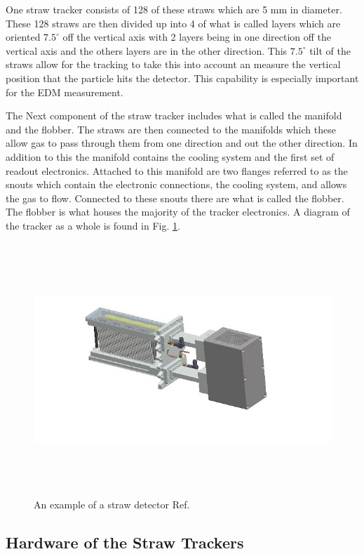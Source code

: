 \documentclass[./Thesis]{subfiles}
\begin{document}
	 One straw tracker consists of 128 of these straws which are 5 mm in diameter. These 128 straws are then divided up into 4 of what is called layers which are oriented $7.5^\circ$ off the vertical axis with 2 layers being in one direction off the vertical axis and the others layers are in the other direction. This $7.5^\circ$ tilt of the straws allow for the tracking to take this into account an measure the vertical position that the particle hits the detector. This capability is especially important for the EDM measurement. 
	 
	 The Next component of the straw tracker includes what is called the manifold and the flobber.  The straws are then connected to the manifolds which these allow gas to pass through them from one direction and out the other direction. In addition to this the manifold contains the cooling system and the first set of readout electronics. Attached to this manifold are two flanges referred to as the snouts which contain the electronic connections, the cooling system, and allows the gas to flow. Connected to these snouts there are what is called the flobber. The flobber is what houses the majority of the tracker electronics. A diagram of the tracker as a whole is found in Fig. \ref{fig:StrawDetector}.
	
\begin{figure}
	\centerline{\includegraphics[height=95mm]{StrawDetector.jpg}}
	\caption[ A Straw Detector]{ An example of a straw detector Ref. \cite{TDR}
	}
	\label{fig:StrawDetector}
\end{figure} 

\subsection{Hardware of the Straw Trackers}
\end{document}
